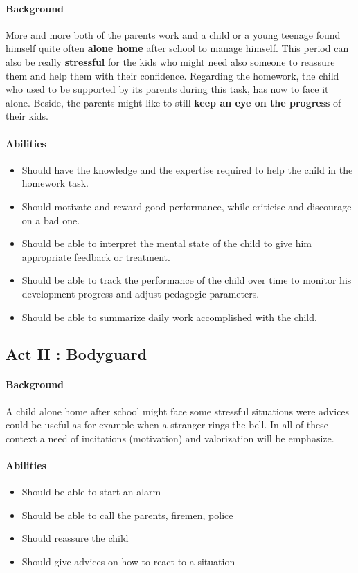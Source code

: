 \paragraph{Background}
More and more both of the parents work and a child or a young teenage found himself quite often \textbf{alone home} after school to manage himself. 
This period can also be really \textbf{stressful} for the kids who might need also someone to reassure them and help them with their confidence. 
Regarding the homework, the child who used to be supported by its parents during this task, has now to face it alone. 
Beside, the parents might like to still \textbf{keep an eye on the progress} of their kids. 
\paragraph{Abilities}

\begin{itemize}
	\item Should have the knowledge and the expertise required to help the child in the homework task.
	\item Should motivate and reward good performance, while criticise and discourage on a bad one. 
	\item Should be able to interpret the mental state of the child to give him appropriate feedback or treatment.
	\item Should be able to track the performance of the child over time to monitor his development progress and adjust pedagogic parameters.
	\item Should be able to summarize daily work accomplished with the child.
\end{itemize}



\subsection{Act II : Bodyguard}
\paragraph{Background}
A child alone home after school might face some stressful situations were advices could be useful as for example when a stranger rings the bell. 
In all of these context a need of incitations (motivation) and valorization will be emphasize. 
\paragraph{Abilities}
\begin{itemize}
\item Should be able to start an alarm
\item Should be able to call the parents, firemen, police
\item Should reassure the child
\item Should give advices on how to react to a situation
\end{itemize}


